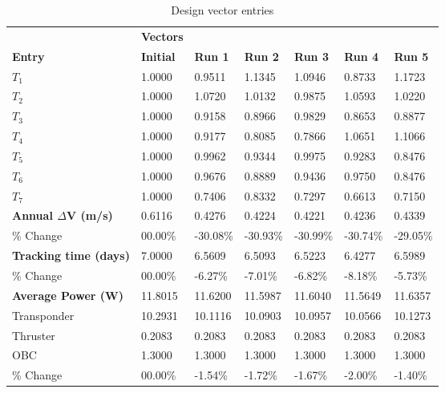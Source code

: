 \begin{table}[H]
\centering
\begin{tabular}{lllllll}
\textbf{} & \cellcolor[HTML]{EFEFEF}\textbf{Vectors} & \textbf{} & \textbf{} & \textbf{} & \textbf{} & \textbf{} \\
\rowcolor[HTML]{EFEFEF} \cellcolor[HTML]{EFEFEF}\textbf{Entry} & \cellcolor[HTML]{EFEFEF}\textbf{Initial} & \cellcolor[HTML]{EFEFEF}\textbf{Run 1} & \cellcolor[HTML]{EFEFEF}\textbf{Run 2} & \cellcolor[HTML]{EFEFEF}\textbf{Run 3} & \cellcolor[HTML]{EFEFEF}\textbf{Run 4} & \cellcolor[HTML]{EFEFEF}\textbf{Run 5} \\
$T_{1}$ & 1.0000 & 0.9511 & 1.1345 & 1.0946 & 0.8733 & 1.1723 \\
$T_{2}$ & 1.0000 & 1.0720 & 1.0132 & 0.9875 & 1.0593 & 1.0220 \\
$T_{3}$ & 1.0000 & 0.9158 & 0.8966 & 0.9829 & 0.8653 & 0.8877 \\
$T_{4}$ & 1.0000 & 0.9177 & 0.8085 & 0.7866 & 1.0651 & 1.1066 \\
$T_{5}$ & 1.0000 & 0.9962 & 0.9344 & 0.9975 & 0.9283 & 0.8476 \\
$T_{6}$ & 1.0000 & 0.9676 & 0.8889 & 0.9436 & 0.9750 & 0.8476 \\
$T_{7}$ & 1.0000 & 0.7406 & 0.8332 & 0.7297 & 0.6613 & 0.7150 \\
\rowcolor[HTML]{EFEFEF} 
\cellcolor[HTML]{EFEFEF}\textbf{Annual $\Delta \boldsymbol{V}$ (m/s)} & \cellcolor[HTML]{EFEFEF}0.6116 & 0.4276 & 0.4224 & 0.4221 & 0.4236 & 0.4339 \\
\% Change & 00.00\% &-30.08\% & -30.93\% & -30.99\% & -30.74\% & -29.05\% \\
\rowcolor[HTML]{EFEFEF} 
\cellcolor[HTML]{EFEFEF}\textbf{Tracking time (days)} & \cellcolor[HTML]{EFEFEF}7.0000 & 6.5609 & 6.5093 & 6.5223 & 6.4277 & 6.5989 \\
\% Change & 00.00\% &-6.27\% & -7.01\% & -6.82\% & -8.18\% & -5.73\% \\
\rowcolor[HTML]{EFEFEF} 
\cellcolor[HTML]{EFEFEF}\textbf{Average Power (W)} & \cellcolor[HTML]{EFEFEF}11.8015 & 11.6200 & 11.5987 & 11.6040 & 11.5649 & 11.6357 \\
Transponder & 10.2931 & 10.1116 & 10.0903 & 10.0957 & 10.0566 & 10.1273 \\
Thruster & 0.2083 & 0.2083 & 0.2083 & 0.2083 & 0.2083 & 0.2083 \\
OBC & 1.3000 & 1.3000 & 1.3000 & 1.3000 & 1.3000 & 1.3000 \\
\% Change & 00.00\% &-1.54\% & -1.72\% & -1.67\% & -2.00\% & -1.40\% \\
\end{tabular}
\caption{Design vector entries}
\label{tab:DesignVectorEntries_default28dur1len3int}
\end{table}